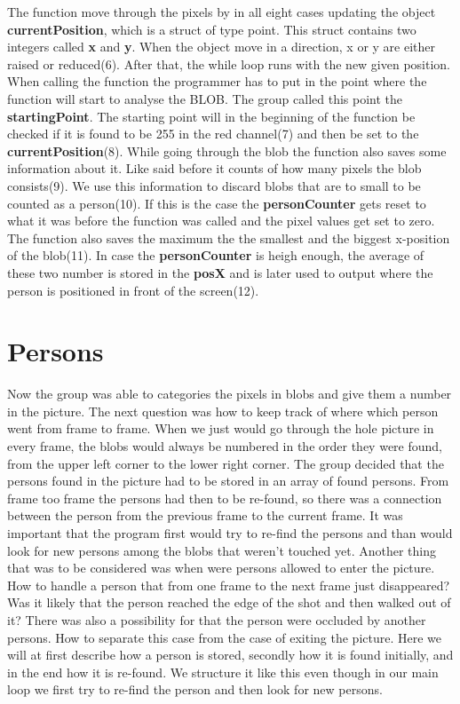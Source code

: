 The function move through the pixels by in all eight cases updating the object \textbf{currentPosition}, which is a struct of type point. This struct contains two integers called \textbf{x} and \textbf{y}. When the object move in a direction, x or y are either raised or reduced(6). After that, the while loop runs with the new given position. When calling the function the programmer has to put in the point where the function will start to analyse the BLOB. The group called this point the \textbf{startingPoint}. The starting point will in the beginning of the function be checked if it is found to be 255 in the red channel(7) and then be set to the \textbf{currentPosition}(8). While going through the blob the function also saves some information about it. Like said before it counts of how many pixels the blob consists(9). We use this information to discard blobs that are to small to be counted as a person(10). If this is the case the \textbf{personCounter} gets reset to what it was before the function was called and the pixel values get set to zero. The function also saves the maximum the the smallest and the biggest x-position of the blob(11). In case the \textbf{personCounter} is heigh enough, the average of these two number is stored in the \textbf{posX} and is later used to output where the person is positioned in front of the screen(12).

\section{Persons}
Now the group was able to categories the pixels in blobs and give them a number in the picture. The next question was how to keep track of where which person went from frame to frame. When we just would go through the hole picture in every frame, the blobs would always be numbered in the order they were found, from the upper left corner to the lower right corner. The group decided that the persons found in the picture had to be stored in an array of found persons. From frame too frame the persons had then to be re-found, so there was a connection between the person from the previous frame to the current frame. It was important that the program first would try to re-find the persons and than would look for new persons among the blobs that weren't touched yet. 
Another thing that was to be considered was when were persons allowed to enter the picture. How to handle a person that from one frame to the next frame  just disappeared? Was it likely that the person reached the edge of the shot and then walked out of it? There was also a possibility for that the person were occluded by another persons. How to separate this case from the case of exiting the picture.
Here we will at first describe how a person is stored, secondly how it is found initially, and in the end how it is re-found. We structure it like this even though in our main loop we first try to re-find the person and then look for new persons. 
